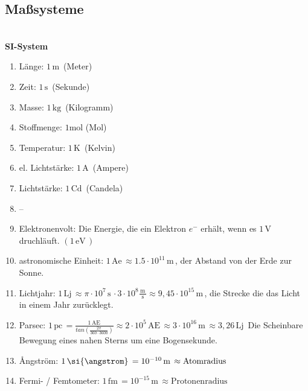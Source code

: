 \documentclass[a4paper,12pt]{article}
\numberwithin{equation}{section}
\begin{document}
\subsection{Maßsysteme}
\hfill\\\textbf{SI-System}
\begin{enumerate}[wide,label=$\cdot$]
        \item Länge: $1\,\text{m}\,$ (Meter)
        \item Zeit: $1\,\text{s}\,$ (Sekunde)
        \item Masse: $1\,\text{kg}\,$ (Kilogramm)
        \item Stoffmenge: $1\text{mol}$ (Mol)
        \item Temperatur: $1\,\text{K}\,$ (Kelvin)
        \item el. Lichtstärke: $1\,\text{A}\,$ (Ampere)
        \item Lichtstärke: $1\,\text{Cd}\,$ (Candela)
        \item[] --
        \item Elektronenvolt: Die Energie, die ein Elektron $e^{-}$ erhält, wenn es $1\,\text{V}\,$ druchläuft. $\left( 1\,\text{eV}\,\right) $ 
        \item astronomische Einheit: $1\,\text{Ae}\, \approx 1.5\cdot 10^{11}\,\text{m}\,$, der Abstand von der Erde zur Sonne.
        \item Lichtjahr: $1\,\text{Lj}\,\approx \pi \cdot 10^{7}\,\text{s}\,\cdot 3\cdot 10^{8}\tfrac{\,\text{m}\,}{\,\text{s}\,}\approx 9,45\cdot 10^{15}\,\text{m}\,$, die Strecke die das Licht in einem Jahr zurücklegt.
        \item Parsec: $1\,\text{pc}\,=\tfrac{1\,\text{AE}\,}{tan\left( \tfrac{2\pi }{360\cdot 3600}\right) }\approx 2\cdot 10^{5}\,\text{AE}\,\approx 3\cdot 10^{16}\,\text{m}\,\approx 3,26\,\text{Lj}\,$ Die Scheinbare Bewegung eines nahen Sterns um eine Bogensekunde.
        \item \si{\angstrom}ngström: $1\,\text{\si{\angstrom}}\,=10^{-10}\,\text{m}\,\approx \text{Atomradius}$ 
        \item Fermi- / Femtometer: $1\,\text{fm}\,=10^{-15}\,\text{m}\,\approx \text{Protonenradius}$ 
\end{enumerate}
\end{document}
